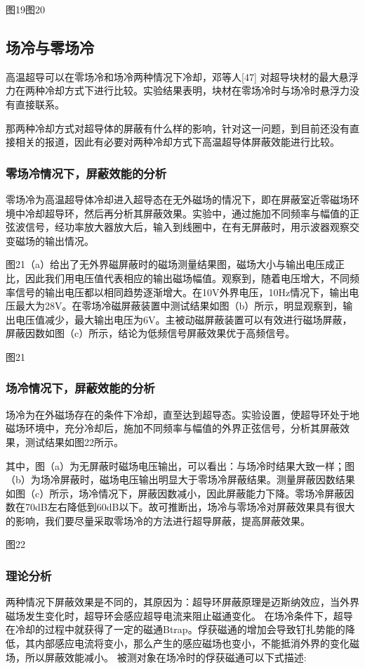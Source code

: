 \documentclass[a4paper,12pt，twoside]{ctexart}
\begin{document}
	 图19图20\par 
	 
	 
	 \subsection{场冷与零场冷}
	 高温超导可以在零场冷和场冷两种情况下冷却，邓等人[47] 对超导块材的最大悬浮力在两种冷却方式下进行比较。实验结果表明，块材在零场冷时与场冷时悬浮力没有直接联系。\par
	 那两种冷却方式对超导体的屏蔽有什么样的影响，针对这一问题，到目前还没有直接相关的报道，因此有必要对两种冷却方式下高温超导体屏蔽效能进行比较。
	 \subsubsection{零场冷情况下，屏蔽效能的分析}
	 零场冷为高温超导体冷却进入超导态在无外磁场的情况下，即在屏蔽室近零磁场环境中冷却超导环，然后再分析其屏蔽效果。实验中，通过施加不同频率与幅值的正弦波信号，经功率放大器放大后，输入到线圈中，在有无屏蔽时，用示波器观察交变磁场的输出情况。\par
	 图21（a）给出了无外界磁屏蔽时的磁场测量结果图，磁场大小与输出电压成正比，因此我们用电压值代表相应的输出磁场幅值。观察到，随着电压增大，不同频率信号的输出电压都以相同趋势逐渐增大。在10V外界电压，10Hz情况下，输出电压最大为28V。在零场冷磁屏蔽装置中测试结果如图（b）所示，明显观察到，输出电压值减少，最大输出电压为6V。主被动磁屏蔽装置可以有效进行磁场屏蔽，屏蔽因数如图（c）所示，结论为低频信号屏蔽效果优于高频信号。\par 
	 图21\par 
	 
	 \subsubsection{场冷情况下，屏蔽效能的分析}
	 场冷为在外磁场存在的条件下冷却，直至达到超导态。实验设置，使超导环处于地磁场环境中，充分冷却后，施加不同频率与幅值的外界正弦信号，分析其屏蔽效果，测试结果如图22所示。\par
	 其中，图（a）为无屏蔽时磁场电压输出，可以看出：与场冷时结果大致一样；图（b）为场冷屏蔽时，磁场电压输出明显大于零场冷屏蔽结果。测量屏蔽因数结果如图（c）所示，场冷情况下，屏蔽因数减小，因此屏蔽能力下降。零场冷屏蔽因数在70dB左右降低到60dB以下。故可推断出，场冷与零场冷对屏蔽效果具有很大的影响，我们要尽量采取零场冷的方法进行超导屏蔽，提高屏蔽效果。\par 
	 图22\par 
	 
	 
	 \subsubsection{理论分析}
	 两种情况下屏蔽效果是不同的，其原因为：超导环屏蔽原理是迈斯纳效应，当外界磁场发生变化时，超导环会感应超导电流来阻止磁通变化。
	 在场冷条件下，超导在冷却的过程中就获得了一定的磁通Btrap。俘获磁通的增加会导致钉扎势能的降低，其内部感应电流将变小，那么产生的感应磁场也变小，不能抵消外界的变化磁场，所以屏蔽效能减小。
	 被测对象在场冷时的俘获磁通可以下式描述: \par 
	 
\end{document}
